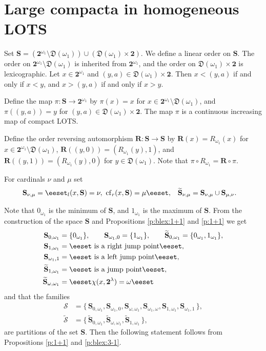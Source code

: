 \documentclass[preprint]{elsarticle}
\def\om{\omega}
\def\la{\lambda}
\def\sset#1{\{#1\}}
\def\set#1{\bbset#1\eeset}
\def\bbset#1:#2\eeset{\{#1\,:\,#2\}}
\def\cS{{\mathcal S}}
\def\wt#1{\widetilde{#1}}
\theoremstyle{definition}
\theoremstyle{remark}
\def\cf{\operatorname{cf}}
\def\lex#1#2{\mathfrak{L}(#2^{#1})}
\def\lex#1#2{#2^{#1}}
\def\homm#1{{\mathfrak{D}(#1)}}
\def\B{2}
\def\B{\mathsf{2}}
\def\B{\mathbf{2}}
\def\lexab{\lex\la\B}
\def\sS{\mathbf{S}}
\def\Rs{\mathbf{R}}
\def\wS{\wt\sS}
\def\wcS{\wt\cS}
\def\mns{0_{\om_1}}
\def\mxs{1_{\om_1}}
\begin{document}

\section{Large compacta in homogeneous LOTS} \label{sec:bcs}

Set $\sS=(\lex{\om_1}\B\setminus \homm{\om_1})\cup (\homm{\om_1}\times\B)$. We define a linear order on $\sS$. The order on $\lex{\om_1}\B\setminus \homm{\om_1}$ is inherited from $\lex{\om_1}\B$, and the order on $\homm{\om_1}\times\B$ is lexicographic. Let $x\in \lex{\om_1}\B$ and $(y,a)\in \homm{\om_1}\times\B$. Then $x<(y,a)$ if and only if $x<y$, and $x>(y,a)$ if and only if $x>y$.

Define the map $\pi: \sS\to \lex{\om_1}\B$ by $\pi(x)=x$ for $x\in \lex{\om_1}\B\setminus \homm{\om_1}$, and $\pi((y,a))=y$ for $(y,a)\in \homm{\om_1}\times\B$. The map $\pi$ is a continuous increasing map of compact LOTS.

Define the order reversing automorphism $\Rs: \sS\to\sS$ by $\Rs(x)=R_{\om_1}(x)$ for $x\in \lex{\om_1}\B\setminus \homm{\om_1}$, $\Rs((y,0))=(R_{\om_1}(y),1)$, and $\Rs((y,1))=(R_{\om_1}(y),0)$ for $y\in  \homm{\om_1}$. Note that $\pi\circ R_{\om_1}=\Rs\circ \pi$.

For cardinals $\nu$ and $\mu$ set
\begin{align*}
\sS_{\nu,\mu} &= \set{x\in\sS: \cf_l(x,\sS)=\nu,\ \cf_r(x,\sS)=\mu},
&
\wS_{\nu,\mu} &= \sS_{\nu,\mu} \cup \sS_{\mu,\nu}.
\end{align*}

Note that $\mns$ is the minimum of $\sS$, and $\mxs$ is the maximum of $\sS$. From the construction of the space $\sS$ and Propositions \ref{p:blex:1+1} and \ref{p:1+1} we get
\begin{align*}
\sS_{0,\om_1}&=\sset{\mns},
\qquad
\sS_{\om_1,0}=\sset{\mxs},
\qquad
\wS_{0,\om_1}=\sset{\mns,\mxs},
\\
\sS_{1,\om_1}&=\set{x\in\sS : x\text{ is a right jump point}},
\\
\sS_{\om_1,1}&=\set{x\in\sS : x\text{ is a left jump point}},
\\
\wS_{1,\om_1}&=\set{x\in\sS : x\text{ is a jump point}},
\\
\wS_{\om,\om_1}&=\set{x\in\sS : \pi\chi(x,\lexab)=\om}
\end{align*}
and that the families
\begin{align*}
\cS &=
\{\,
\sS_{0,\om_1}, \sS_{\om_1,0}, \sS_{\om,\om_1}, \sS_{\om_1,\om}, \sS_{1,\om_1}, \sS_{\om_1,1}
\,\},
\\
\wcS &=
\{\,
\wS_{0,\om_1}, \wS_{\om,\om_1}, \wS_{1,\om_1}
\,\},
\end{align*}
are partitions of the set $\sS$.
%
%
Then the following statement follows from Propositions \ref{p:1+1} and \ref{p:blex:3-1}.
\end{document}
